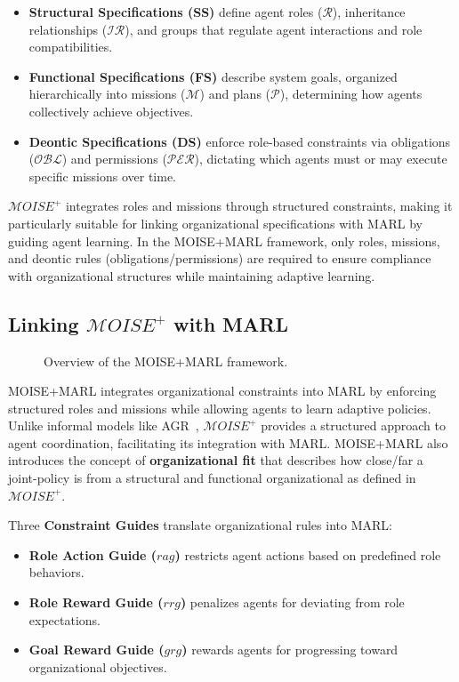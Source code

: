 \documentclass[pdflatex,sn-mathphys-num]{sn-jnl}%
\theoremstyle{thmstyleone}%
\theoremstyle{thmstyletwo}%
\theoremstyle{thmstylethree}%
\begin{document}
\begin{itemize}
    \item \textbf{Structural Specifications (SS)} define agent roles ($\mathcal{R}$), inheritance relationships ($\mathcal{IR}$), and groups that regulate agent interactions and role compatibilities.
    \item \textbf{Functional Specifications (FS)} describe system goals, organized hierarchically into missions ($\mathcal{M}$) and plans ($\mathcal{P}$), determining how agents collectively achieve objectives.
    \item \textbf{Deontic Specifications (DS)} enforce role-based constraints via obligations ($\mathcal{OBL}$) and permissions ($\mathcal{PER}$), dictating which agents must or may execute specific missions over time.
\end{itemize}

$\mathcal{M}OISE^+$ integrates roles and missions through structured constraints, making it particularly suitable for linking organizational specifications with MARL by guiding agent learning. In the MOISE+MARL framework, only roles, missions, and deontic rules (obligations/permissions) are required to ensure compliance with organizational structures while maintaining adaptive learning.

\subsection{Linking $\mathcal{M}OISE^+$ with MARL}

\begin{figure}[h!]
    \centering
    
    \caption{Overview of the MOISE+MARL framework.}
    \label{fig:mm_synthesis}
\end{figure}

MOISE+MARL integrates organizational constraints into MARL by enforcing structured roles and missions while allowing agents to learn adaptive policies. Unlike informal models like AGR~\cite{ferber2003}, $\mathcal{M}OISE^+$ provides a structured approach to agent coordination, facilitating its integration with MARL. MOISE+MARL also introduces the concept of \textbf{organizational fit} that describes how close/far a joint-policy is from a structural and functional organizational as defined in $\mathcal{M}OISE^+$.

Three \textbf{Constraint Guides} translate organizational rules into MARL:
\begin{itemize}
    \item \textbf{Role Action Guide ($rag$)} restricts agent actions based on predefined role behaviors.
    \item \textbf{Role Reward Guide ($rrg$)} penalizes agents for deviating from role expectations.
    \item \textbf{Goal Reward Guide ($grg$)} rewards agents for progressing toward organizational objectives.
\end{itemize}
\end{document}
